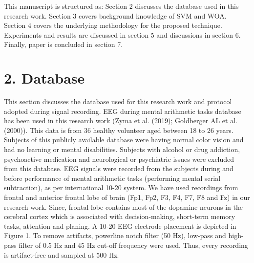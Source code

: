 \documentclass{article}
\begin{document}
This manuscript is structured as: Section 2 discusses the database used in this research work. Section 3 covers background knowledge of SVM and WOA. Section 4 covers the underlying methodology for the proposed technique. Experiments and results are discussed in section 5 and discussions in section 6. Finally, paper is concluded in section 7.


\section{2. Database}

This section discusses the database used for this research work and protocol adopted during signal recording. EEG during mental arithmetic tasks database has been used in this research work (Zyma et al. (2019); Goldberger AL et al. (2000)). This data is from 36 healthy volunteer aged between 18 to 26 years. Subjects of this publicly available database were having normal color vision and had no learning or mental disabilities. Subjects with alcohol or drug addiction, psychoactive medication and neurological or psychiatric issues were excluded from this database. EEG signals were recorded from the subjects during and before performance of mental arithmetic tasks (performing mental serial subtraction), as per international 10-20 system. We have used recordings from frontal and anterior frontal lobe of brain (Fp1, Fp2, F3, F4, F7, F8 and Fz) in our research work. Since, frontal lobe contains most of the dopamine neurons in the cerebral cortex which is associated with decision-making, short-term memory tasks, attention and planing. A 10-20 EEG electrode placement is depicted in Figure 1. To remove artifacts, powerline notch filter (50 Hz), low-pass and high-pass filter of 0.5 $\mathrm{Hz}$ and 45 Hz cut-off frequency were used. Thus, every recording is artifact-free and sampled at 500 Hz.
\end{document}
